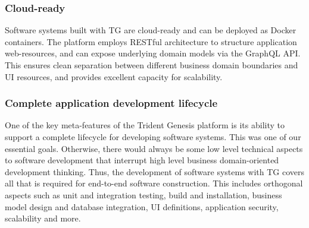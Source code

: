 \documentclass[a4paper,10pt,twocolumn,oneside,openright,final]{memoir}
\begin{document}
\subsubsection*{Cloud-ready}
	Software systems built with TG are cloud-ready and can be deployed as Docker containers.
	The platform employs RESTful architecture to structure application web-resources, and can expose underlying domain models via the GraphQL API.
	This ensures clean separation between different business domain boundaries and UI resources, and provides excellent capacity for scalability.

\subsubsection*{Complete application development lifecycle}
	One of the key meta-features of the Trident Genesis platform is its ability to support a complete lifecycle for developing software systems.
	This was one of our essential goals.
	Otherwise, there would always be some low level technical aspects to software development that interrupt high level business domain-oriented development thinking.
	Thus, the development of software systems with TG covers all that is required for end-to-end software construction.
	This includes orthogonal aspects such as unit and integration testing, build and installation, business model design and database integration, UI definitions, application security, scalability and more.
\end{document}
